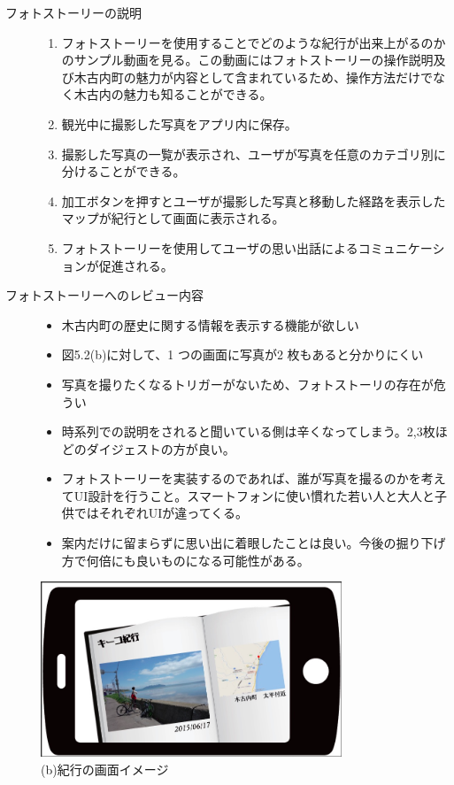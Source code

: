 \begin{description}
 \item[フォトストーリーの説明]\mbox{}
 \begin{enumerate}
 \item フォトストーリーを使用することでどのような紀行が出来上がるのかのサンプル動画を見る。この動画にはフォトストーリーの操作説明及び木古内町の魅力が内容として含まれているため、操作方法だけでなく木古内の魅力も知ることができる。
  \item 観光中に撮影した写真をアプリ内に保存。
 \item 撮影した写真の一覧が表示され、ユーザが写真を任意のカテゴリ別に分けることができる。
 \item 加工ボタンを押すとユーザが撮影した写真と移動した経路を表示したマップが紀行として画面に表示される。
 \item フォトストーリーを使用してユーザの思い出話によるコミュニケーションが促進される。
\end{enumerate}
\item[フォトストーリーへのレビュー内容]\mbox{}
 \begin{itemize}
 \item 木古内町の歴史に関する情報を表示する機能が欲しい
 \item 図5.2(b)に対して、1 つの画面に写真が2 枚もあると分かりにくい
 \item 写真を撮りたくなるトリガーがないため、フォトストーリの存在が危うい
 \item 時系列での説明をされると聞いている側は辛くなってしまう。2,3枚ほどのダイジェストの方が良い。
 \item フォトストーリーを実装するのであれば、誰が写真を撮るのかを考えてUI設計を行うこと。スマートフォンに使い慣れた若い人と大人と子供ではそれぞれUIが違ってくる。
 \item 案内だけに留まらずに思い出に着眼したことは良い。今後の掘り下げ方で何倍にも良いものになる可能性がある。
 \end{itemize}
\end{description}

\begin{figure}[htbp]
 \begin{center}
\includegraphics[width=9cm, bb=0 0 857 498]{5.1_kikou.png}
 \end{center}
\addtocounter{figure}{-1}
 \caption{(b)紀行の画面イメージ}
 \label{fig:one}
\end{figure}
